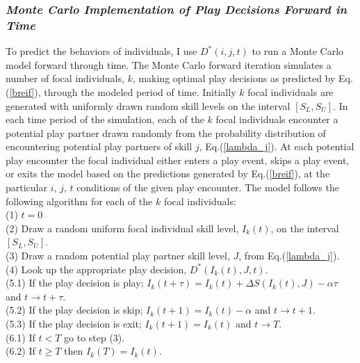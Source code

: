 \documentclass[12pt,letterpaper]{article}
\begin{document}
    \subsubsection{\it Monte Carlo Implementation of Play Decisions Forward in Time}  
      To predict the behaviors of individuals, I use $D^*(i,j,t)$ to run a Monte Carlo model forward through time. 
      The Monte Carlo forward iteration simulates a number of focal individuals, $k$, making optimal play decisions as predicted by Eq.(\ref{breif}), through the modeled period of time. 
      Initially $k$ focal individuals are generated with uniformly drawn random skill levels on the interval $[S_L,S_U]$. 
      In each time period of the simulation, each of the $k$ focal individuals encounter a potential play partner drawn randomly from the probability distribution of encountering potential play partners of skill $j$, Eq.(\ref{lambda_j}). 
      At each potential play encounter the focal individual either enters a play event, skips a play event, or exits the model based on the predictions generated by Eq.(\ref{breif}), at the particular $i$, $j$, $t$ conditions of the given play encounter.  
      The model follows the following algorithm for each of the $k$ focal individuals:
      \\
      (1) $t=0$\\
      (2) Draw a random uniform focal individual skill level, $I_k(t)$, on the interval $[S_L,S_U]$.   \\
      (3) Draw a random potential play partner skill level, $J$, from Eq.(\ref{lambda_j}).\\
      (4) Look up the appropriate play decision, $D^*(I_k(t),J,t)$.\\ 
      (5.1) If the play decision is play; $I_k(t+\tau)=I_{k}(t)+\Delta S(I_k(t),J)-\alpha \tau$ and $t \rightarrow t+\tau$.\\ 
      (5.2) If the play decision is skip; $I_k(t+1)=I_{k}(t)-\alpha$ and $t \rightarrow t+1$.\\
      (5.3) If the play decision is exit; $I_k(t+1)=I_{k}(t)$ and $t \rightarrow T$.\\
      (6.1) If $t < T$ go to step (3). \\
      (6.2) If $t \ge T$ then $I_k(T)=I_k(t)$.   
\end{document}
